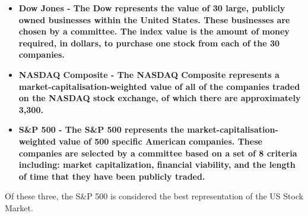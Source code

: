 \begin{itemize}
    \item \bf Dow Jones \rm - The Dow represents the value of 30 large, publicly owned businesses within the United States. These businesses are chosen by a committee. The index value is the amount of money required, in dollars, to purchase one stock from each of the 30 companies.
    \item \bf NASDAQ Composite \rm - The NASDAQ Composite represents a market-capitalisation-weighted value of all of the companies traded on the NASDAQ stock exchange, of which there are approximately 3,300.
    \item \bf S\&P 500 \rm - The S\&P 500 represents the market-capitalisation-weighted value of 500 specific American companies. These companies are selected by a committee based on a set of 8 criteria including:  market capitalization, financial viability, and the length of time that they have been publicly traded.
\end{itemize}

Of these three, the S\&P 500 is considered the best representation of the US Stock Market. \cite{snp500Best} \newline

